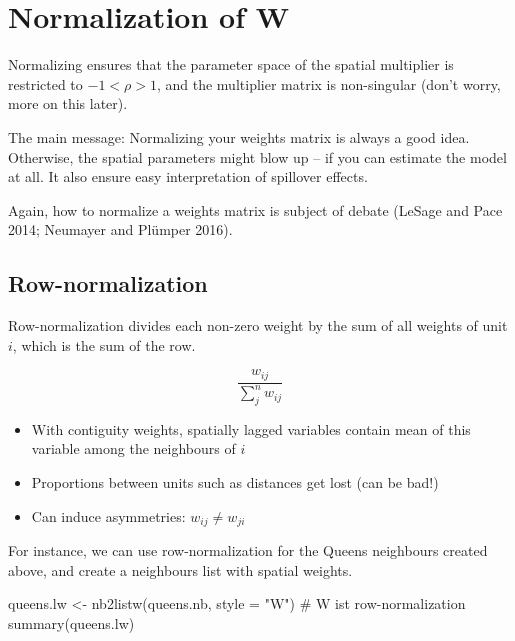 \documentclass[
  letterpaper,
]{scrbook}
\newenvironment{Shaded}{\begin{snugshade}}{\end{snugshade}}
\newcommand{\AttributeTok}[1]{\textcolor[rgb]{0.40,0.45,0.13}{#1}}
\newcommand{\CommentTok}[1]{\textcolor[rgb]{0.37,0.37,0.37}{#1}}
\newcommand{\FunctionTok}[1]{\textcolor[rgb]{0.28,0.35,0.67}{#1}}
\newcommand{\NormalTok}[1]{\textcolor[rgb]{0.00,0.23,0.31}{#1}}
\newcommand{\OtherTok}[1]{\textcolor[rgb]{0.00,0.23,0.31}{#1}}
\newcommand{\StringTok}[1]{\textcolor[rgb]{0.13,0.47,0.30}{#1}}
\begin{document}
\hypertarget{normalization-of-boldsymbolmathbfw}{%
\section{\texorpdfstring{Normalization of
\({\boldsymbol{\mathbf{W}}}\)}{Normalization of \{\textbackslash boldsymbol\{\textbackslash mathbf\{W\}\}\}}}\label{normalization-of-boldsymbolmathbfw}}

Normalizing ensures that the parameter space of the spatial multiplier
is restricted to \(-1 < \rho > 1\), and the multiplier matrix is
non-singular (don't worry, more on this later).

The main message: Normalizing your weights matrix is always a good idea.
Otherwise, the spatial parameters might blow up -- if you can estimate
the model at all. It also ensure easy interpretation of spillover
effects.

Again, how to normalize a weights matrix is subject of debate (LeSage
and Pace 2014; Neumayer and Plümper 2016).

\hypertarget{row-normalization}{%
\subsection{Row-normalization}\label{row-normalization}}

Row-normalization divides each non-zero weight by the sum of all weights
of unit \(i\), which is the sum of the row.

\[
\frac{w_{ij}}{\sum_j^n w_{ij}}
\]

\begin{itemize}
\item
  With contiguity weights, spatially lagged variables contain mean of
  this variable among the neighbours of \(i\)
\item
  Proportions between units such as distances get lost (can be bad!)
\item
  Can induce asymmetries: \(w_{ij} \neq w_{ji}\)
\end{itemize}

For instance, we can use row-normalization for the Queens neighbours
created above, and create a neighbours list with spatial weights.

\begin{Shaded}
\begin{Highlighting}[]
\NormalTok{queens.lw }\OtherTok{\textless{}{-}} \FunctionTok{nb2listw}\NormalTok{(queens.nb,}
                      \AttributeTok{style =} \StringTok{"W"}\NormalTok{) }\CommentTok{\# W ist row{-}normalization}
\FunctionTok{summary}\NormalTok{(queens.lw)}
\end{Highlighting}
\end{Shaded}
\end{document}

